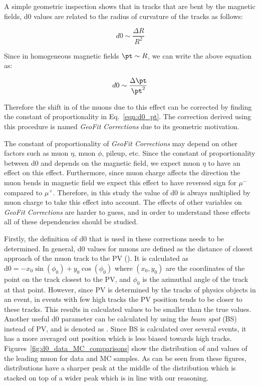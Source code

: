 A simple geometric inspection shows that in tracks that are bent by the magnetic fields, d0 values are related to the radius of curvature of the tracks as follows:

\begin{equation}
  d0 \sim \frac{\Delta R}{R^2}
\label{eqn:d0_R}
\end{equation} 

Since in homogeneous magnetic fields $\pt \sim R$, we can write the above equation as:

\begin{equation}
  d0 \sim \frac{\Delta \pt}{\pt^2} 
\label{eqn:d0_pt}
\end{equation}

Therefore the shift in \pt of the muons due to this effect can be corrected by finding the constant of proportionality in Eq.~\ref{eqn:d0_pt}. The correction derived using this procedure is named \textit{GeoFit Corrections} due to its geometric motivation. 

The constant of proportionality of \textit{GeoFit Corrections} may depend on other factors such as muon $\eta$, muon $\phi$, pileup, etc. Since the constant of proportionality between d0 and \pt depends on the magnetic field, we expect muon $\eta$ to have an effect on this effect. Furthermore, since muon charge affects the direction the muon bends in magnetic field we expect this effect to have reversed sign for $\mu^-$ compared to $\mu^+$. Therefore, in this study the value of d0 is always multiplied by muon charge to take this effect into account. The effects of other variables on \textit{GeoFit Corrections} are harder to guess, and in order to understand these effects all of these dependencies should be studied.

Firstly, the definition of d0 that is used in these corrections needs to be determined. In general, d0 values for muons are defined as the distance of closest approach of the muon track to the PV (\dzeroPV). It is calculated as $\text{d0} = -x_0\sin(\phi_0) + y_0 \cos(\phi_0)$ where $(x_0,y_0)$ are the coordinates of the point on the track closest to the PV, and $\phi_0$ is the azimuthal angle of the track at that point. However, since PV is determined by the tracks of physics objects in an event, in events with few high \pt tracks the PV position tends to be closer to these tracks. This results in calculated \dzeroPV values to be smaller than the true values. Another useful d0 parameter can be calculated by using the \textit{beam spot} (BS) instead of PV, and is denoted as \dzeroBS. Since BS is calculated over several events, it has a more averaged out position which is less biased towards high \pt tracks. Figures~\ref{fig:d0_data_MC_comparisons} show the distribution of \dzeroPV and \dzeroBS values of the leading muon for data and MC samples. As can be seen from these figures, \dzeroPV distributions have a sharper peak at the middle of the distribution which is stacked on top of a wider peak which is in line with our reasoning.

